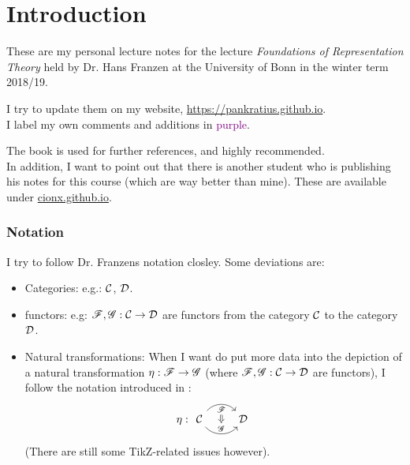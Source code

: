 \chapter*{Introduction}
These are my personal lecture notes for the lecture \textit{Foundations of Representation Theory} held by Dr. Hans Franzen at the University of Bonn in the winter term 2018/19.\par
I try to update them on my website, \url{https://pankratius.github.io}.\\
I label my own comments and additions in \textcolor{purple}{purple}.\par
The book \cite{aluffi} is used for further references, and highly recommended.\\ In addition, I want to point out that there is another student who is publishing his notes for this course (which are way better than mine). These are available under \url{cionx.github.io}.
\subsection*{Notation}
I try to follow Dr. Franzens notation closley. Some deviations are:
\begin{itemize}
  \item Categories: e.g.: $\mathcal{C}$, $\mathcal{D}$.
  \item functors: e.g: $\mathscr{F},\mathscr{G}:\mathcal{C} \to \mathcal{D}$ are functors from the category $\mathcal{C}$ to the category $\mathcal{D}$.
  \item Natural transformations: When I want do put more data into the depiction of a natural transformation $\eta:\mathscr{F}\to \mathscr{G}$ (where $\mathscr{F},\mathscr{G}:\mathcal{C}\to \mathcal{D}$ are functors), I follow the notation introduced in \cite{context}:
  \[
  \eta: \begin{tikzcd}
  \ccat\arrow[r, bend left=50, "\ffunc"{name=U, below}]
  \arrow[r, bend right=50, "\gfunc"{name=D}]
  &\dcat
  \arrow[Rightarrow, from=U, to=D]
\end{tikzcd}\] (There are still some TikZ-related issues however).
\end{itemize}
